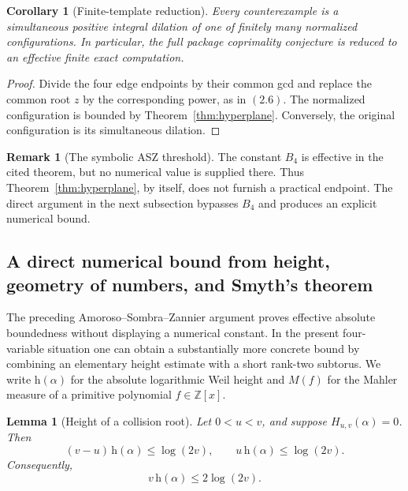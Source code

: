 \documentclass[11pt]{article}
\newtheorem{lemma}[theorem]{Lemma}
\newtheorem{corollary}[theorem]{Corollary}
\theoremstyle{definition}
\newtheorem{remark}[theorem]{Remark}
\newcommand{\Z}{\mathbb Z}
\begin{document}
\begin{corollary}[Finite-template reduction]\label{cor:finiteglobal}
Every counterexample is a simultaneous positive integral dilation of one of
finitely many normalized configurations.  In particular, the full package
coprimality conjecture is reduced to an effective finite exact computation.
\end{corollary}

\begin{proof}
Divide the four edge endpoints by their common gcd and replace the common
root \(z\) by the corresponding power, as in \((2.6)\).  The normalized
configuration is bounded by Theorem~\ref{thm:hyperplane}.  Conversely, the
original configuration is its simultaneous dilation.
\end{proof}

\begin{remark}[The symbolic ASZ threshold]
The constant \(B_4\) is effective in the cited theorem, but no numerical
value is supplied there.  Thus Theorem~\ref{thm:hyperplane}, by itself, does
not furnish a practical endpoint.  The direct argument in the next subsection
bypasses \(B_4\) and produces an explicit numerical bound.
\end{remark}

\subsection{A direct numerical bound from height, geometry of numbers, and Smyth's theorem}
\label{subsec:explicitbound}

The preceding Amoroso--Sombra--Zannier argument proves effective absolute
boundedness without displaying a numerical constant.  In the present
four-variable situation one can obtain a substantially more concrete bound
by combining an elementary height estimate with a short rank-two subtorus.
We write \(\mathrm h(\alpha)\) for the absolute logarithmic Weil height and
\(M(f)\) for the Mahler measure of a primitive polynomial \(f\in\Z[x]\).

\begin{lemma}[Height of a collision root]\label{lem:collisionheight}
Let \(0<u<v\), and suppose \(H_{u,v}(\alpha)=0\).  Then
\begin{equation}
 (v-u)\,\mathrm h(\alpha)\leq\log(2v),
 \qquad
 u\,\mathrm h(\alpha)\leq\log(2v).
 \tag{17.5}
\end{equation}
Consequently,
\begin{equation}
 v\,\mathrm h(\alpha)\leq2\log(2v).
 \tag{17.6}
\end{equation}
\end{lemma}
\end{document}
